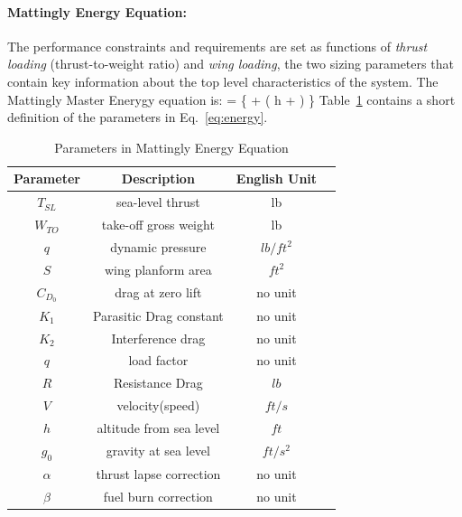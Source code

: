 \documentclass[pdftex,11pt,letter]{article}
\begin{document}
\paragraph{Mattingly Energy Equation:} The performance constraints and requirements are set as functions of \emph{thrust loading} (thrust-to-weight ratio) and \emph{wing loading}, the two sizing parameters that contain key information about the top level characteristics of the system\cite{MattinglyText}. The Mattingly Master Enerygy equation is:
\beq\label{eq:energy}
 = \dfrac{\beta}{\alpha} 
\left\{ 
+
  \left( h + \right)
\right\}
\eeq
Table~\ref{tab:param_energy} contains a short definition of the parameters in Eq.~\ref{eq:energy}. 
\begin{table}[h]
\caption{Parameters in Mattingly Energy Equation}
\centering 
\begin{tabular}{c c c c}
\hline\hline
 {Parameter} & Description & English Unit \\
\hline\hline
$T_{SL}$  & sea-level thrust           & lb  \\
$W_{TO}$  & take-off gross weight      & lb   \\
$q$      & dynamic pressure           & $lb/ft^2$ \\
$S$      & wing planform area         & $ft^2$   \\
$C_{D_0}$ & drag at zero lift          &  no unit \\
$K_1$    &  Parasitic Drag constant   &   no unit       \\ 
$K_2$    & Interference drag          &   no unit      \\
$q$      & load factor                & no unit \\ 
$R$      &  Resistance Drag           &  $lb$     \\ 
$V$      &  velocity(speed)           &  $ft/s$  \\
$h$     &  altitude from sea level   & $ft$    \\
$g_0$   &  gravity at sea level      & $ft/s^2$ \\
$\alpha$&  thrust lapse correction   &  no unit  \\
$\beta$ & fuel burn correction       &    no unit\\
\hline
\end{tabular}
\label{tab:param_energy}
\end{table}
\end{document}
